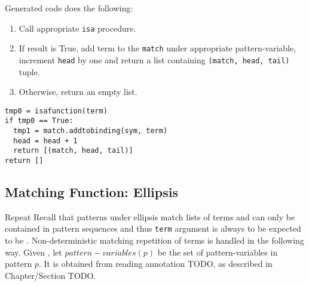 Generated code does the following:

\begin{enumerate}
\item Call appropriate \texttt{isa} procedure. 
\item If result is True, add term to the \texttt{match} under appropriate pattern-variable, increment \texttt{head} by one and return a list containing \texttt{(match, head, tail)} tuple.
\item Otherwise, return an empty list.
\end{enumerate}


\begin{lstlisting}
tmp0 = isafunction(term)
if tmp0 == True:
  tmp1 = match.addtobinding(sym, term) 
  head = head + 1
  return [(match, head, tail)]
return []
\end{lstlisting}

\subsection{Matching Function: Ellipsis}
Repeat Recall that patterns under ellipsis match lists of terms and can only be contained in pattern sequences and thus \texttt{term} argument is always to be expected to be \PatternSequence. Non-deterministic matching repetition of terms is handled in the following way. Given \Repeat, let $pattern-variables(p)$ be the set of pattern-variables in pattern $p$. It is obtained from reading annotation TODO, as described in Chapter/Section TODO. 

